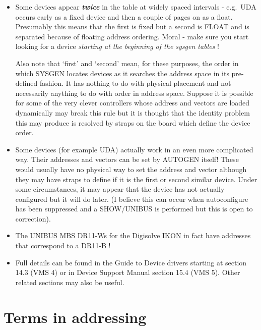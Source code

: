 \begin{itemize}
\item Some devices appear {\bf\it twice} in the table at widely spaced
intervals - e.g.\ UDA occurs early as a fixed device and then
a couple of pages on as a float. Presumably this means that
the first is fixed but a second is FLOAT and is separated because
of floating address ordering. Moral - make sure you start looking
for a device {\it starting at the beginning of the sysgen tables} !

Also note that `first' and `second' mean, for these purposes, the order
in which SYSGEN locates devices as it searches the address space in its
pre-defined fashion.
It has nothing to do with physical placement and not necessarily anything
to do with order in address space.
Suppose it is possible for some of the very clever controllers whose address
and vectors are loaded dynamically may break this rule but it is thought
that the identity problem this may produce is resolved by straps on the board
which define the device order.

\item Some devices (for example UDA) actually work in an even more
complicated way.
Their addresses and vectors can be set by AUTOGEN itself!
These would usually have no physical way to set the address and vector
although they may have straps to define if it is the first or second
similar device.
Under some circumstances, it may appear that the device has not actually
configured but it will do later.
(I believe this can occur when autoconfigure has been suppressed and a
SHOW/UNIBUS is performed but this is open to correction).

\item The UNIBUS MBS DR11-Ws for the Digisolve IKON in fact have addresses
that correspond to a DR11-B !

\item Full details can be found in the Guide to Device drivers starting
at section 14.3 (VMS 4) or in Device Support Manual section 15.4 (VMS 5).
Other related sections may also be useful.

\end{itemize}

\section{Terms in addressing}

